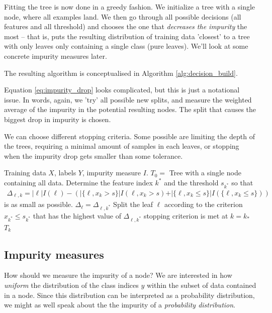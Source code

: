 \documentclass{article}
\newcommand{\abs}[1]{\vert #1 \vert}
\begin{document}
Fitting the tree is now done in a greedy fashion. We initialize a tree with a single node, where all examples land. We then go through all possible decisions (all features and all threshold) and chooses the one that \emph{decreases the impurity} the most -- that is, puts the resulting distribution of training data 'closest' to a tree with only leaves only containing a single class (pure leaves). We'll look at some concrete impurity measures later.


The resulting algorithm is conceptualised in Algorithm \ref{alg:decision_build}.

Equation \eqref{eq:impurity_drop} looks complicated, but this is just a notational issue. In words, again, we 'try' all possible new splits, and measure the weighted average of the impurity in the potential resulting nodes. The split that causes the biggest drop in impurity is chosen.

We can choose different stopping criteria. Some possible are limiting the depth of the trees, requiring a minimal amount of samples in each leaves, or stopping when the impurity drop gets smaller than some tolerance.

\begin{algorithm}[tb]      
	\caption{Building a decision tree} 
	\begin{algorithmic} [1]
 		\REQUIRE Training data $X$, labels $Y$, impurity measure $I$.\label{alg:decision_build}
 		\STATE $T_0=$ Tree with a single node containing all data.
 		\REPEAT
                \STATE Determine the feature index $k^*$ and the threshold $s_{k^*}$ so that
                \begin{align}
                    \Delta_{\ell,k} = \abs{\ell} I(\ell)  - \left(\abs{\{\ell, x_k>s\}} I(\ell, x_k>s) + \abs{\{\ell, x_k\leq s\}} I(\{\ell, x_k\leq s\})\right) \label{eq:impurity_drop}
                \end{align}
                is as small as possible.
                \STATE $\Delta_\ell = \Delta_{\ell,k^*}$
            \ENDFOR
            \STATE Split the leaf $\ell$ according to the criterion $x_{k^*}\leq s_{k^*}$ that has the highest value of $\Delta_{\ell,k^*}$
 		\UNTIL stopping criterion is met at $k= k_*$
 		\RETURN $T_k$
	\end{algorithmic}
\end{algorithm}

\subsection{Impurity measures} How should we measure the impurity of a node? We are interested in how \emph{uniform} the distribution of the class indices $y$ within the subset of data contained in a node. Since this distribution can be interpreted as a probability distribution, we might as well speak about the the impurity of a \emph{probability distribution}.
\end{document}
